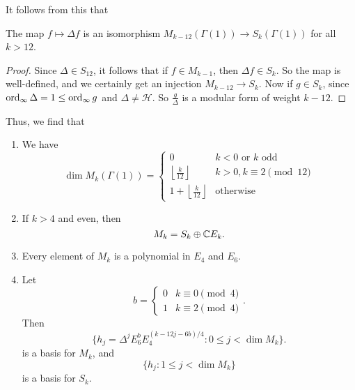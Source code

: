\documentclass[a4paper]{article}
\renewcommand{\H}{\mathcal{H}}
\begin{document}
It follows from this that
\begin{prop}
  The map $f \mapsto \Delta f$ is an isomorphism $M_{k - 12}(\Gamma(1)) \to S_k(\Gamma(1))$ for all $k > 12$.
\end{prop}

\begin{proof}
  Since $\Delta \in S_{12}$, it follows that if $f \in M_{k - 1}$, then $\Delta f \in S_k$. So the map is well-defined, and we certainly get an injection $M_{k - 12} \to S_k$. Now if $g \in S_k$, since $\operatorname{ord}_\infty \Delta = 1 \leq \operatorname{ord}_\infty g$ and $\Delta \not= \H$. So $\frac{g}{\Delta}$ is a modular form of weight $k - 12$.
\end{proof}

Thus, we find that
\begin{thm}\leavevmode
  \begin{enumerate}
    \item We have
      \[
        \dim M_k (\Gamma(1)) =
        \begin{cases}
          0 & k < 0\text{ or }k \text{ odd }\\
          \left\lfloor \frac{k}{12}\right\rfloor & k > 0, k \equiv 2 \pmod{12}\\
          1 + \left\lfloor \frac{k}{12}\right\rfloor & \text{otherwise}
        \end{cases}
      \]
    \item If $k > 4$ and even, then
      \[
        M_k = S_k \oplus \mathbb{C} E_k.
      \]
    \item Every element of $M_k$ is a polynomial in $E_4$ and $E_6$.
    \item Let
      \[
        b =
        \begin{cases}
          0 & k\equiv 0 \pmod 4\\
          1 & k\equiv 2 \pmod 4
        \end{cases}.
      \]
      Then
      \[
        \{h_j = \Delta^j E_6^b E_4^{(k - 12j - 6b)/4} : 0 \leq j < \dim M_k\}.
      \]
      is a basis for $M_k$, and
      \[
        \{h_j : 1 \leq j < \dim M_k\}
      \]
      is a basis for $S_k$.
  \end{enumerate}
\end{thm}
\end{document}
